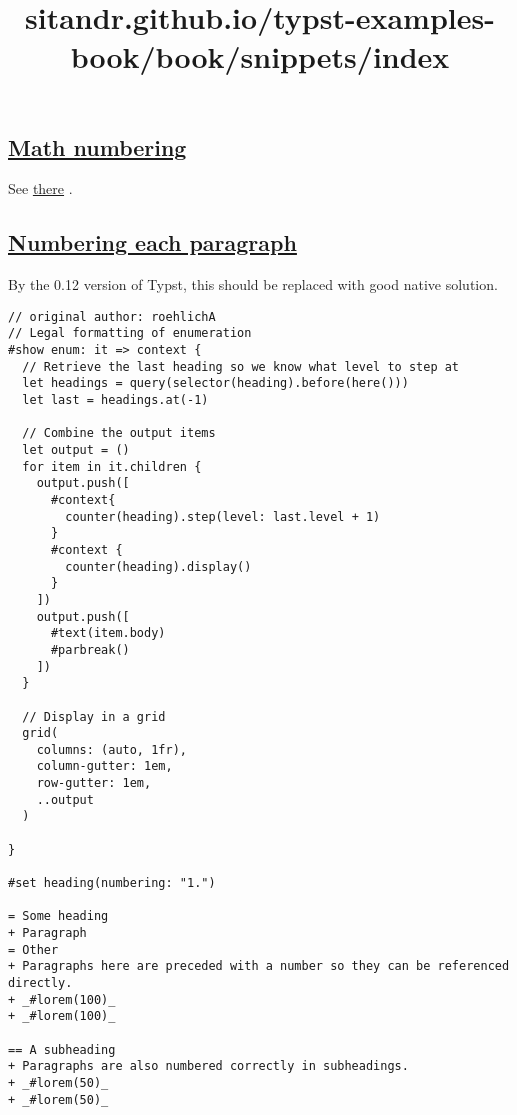 \pandocbounded{}

\subsection{\texorpdfstring{\hyperref[math-numbering]{Math
numbering}}{Math numbering}}\label{math-numbering}

See \href{./math/numbering.html}{there} .

\subsection{\texorpdfstring{\hyperref[numbering-each-paragraph]{Numbering
each
paragraph}}{Numbering each paragraph}}\label{numbering-each-paragraph}

By the 0.12 version of Typst, this should be replaced with good native
solution.

\begin{verbatim}
// original author: roehlichA
// Legal formatting of enumeration
#show enum: it => context {
  // Retrieve the last heading so we know what level to step at
  let headings = query(selector(heading).before(here()))
  let last = headings.at(-1)

  // Combine the output items
  let output = ()
  for item in it.children {
    output.push([
      #context{
        counter(heading).step(level: last.level + 1)
      }
      #context {
        counter(heading).display() 
      }
    ])
    output.push([
      #text(item.body)
      #parbreak()
    ])
  }

  // Display in a grid
  grid(
    columns: (auto, 1fr),
    column-gutter: 1em,
    row-gutter: 1em,
    ..output
  )

}

#set heading(numbering: "1.")

= Some heading
+ Paragraph
= Other
+ Paragraphs here are preceded with a number so they can be referenced directly.
+ _#lorem(100)_
+ _#lorem(100)_

== A subheading
+ Paragraphs are also numbered correctly in subheadings.
+ _#lorem(50)_
+ _#lorem(50)_
\end{verbatim}

\pandocbounded{}


\title{sitandr.github.io/typst-examples-book/book/snippets/index}

